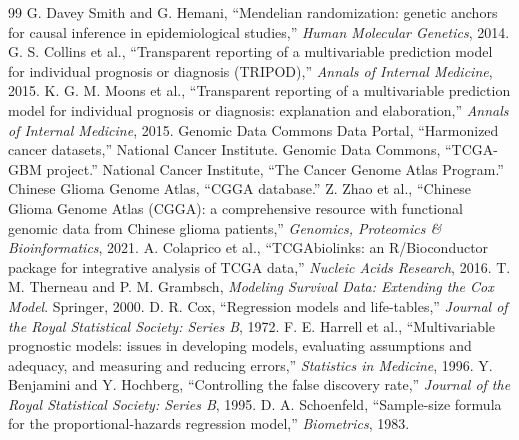 \documentclass[conference]{IEEEtran}
\begin{document}
\begin{thebibliography}{99}
 G. Davey Smith and G. Hemani, ``Mendelian randomization: genetic anchors for causal inference in epidemiological studies,'' \emph{Human Molecular Genetics}, 2014.
 G. S. Collins et al., ``Transparent reporting of a multivariable prediction model for individual prognosis or diagnosis (TRIPOD),'' \emph{Annals of Internal Medicine}, 2015.
 K. G. M. Moons et al., ``Transparent reporting of a multivariable prediction model for individual prognosis or diagnosis: explanation and elaboration,'' \emph{Annals of Internal Medicine}, 2015.
 Genomic Data Commons Data Portal, ``Harmonized cancer datasets,'' National Cancer Institute.
 Genomic Data Commons, ``TCGA-GBM project.''
 National Cancer Institute, ``The Cancer Genome Atlas Program.''
 Chinese Glioma Genome Atlas, ``CGGA database.''
 Z. Zhao et al., ``Chinese Glioma Genome Atlas (CGGA): a comprehensive resource with functional genomic data from Chinese glioma patients,'' \emph{Genomics, Proteomics \& Bioinformatics}, 2021.
 A. Colaprico et al., ``TCGAbiolinks: an R/Bioconductor package for integrative analysis of TCGA data,'' \emph{Nucleic Acids Research}, 2016.
 T. M. Therneau and P. M. Grambsch, \emph{Modeling Survival Data: Extending the Cox Model}. Springer, 2000.
 D. R. Cox, ``Regression models and life-tables,'' \emph{Journal of the Royal Statistical Society: Series B}, 1972.
 F. E. Harrell et al., ``Multivariable prognostic models: issues in developing models, evaluating assumptions and adequacy, and measuring and reducing errors,'' \emph{Statistics in Medicine}, 1996.
 Y. Benjamini and Y. Hochberg, ``Controlling the false discovery rate,'' \emph{Journal of the Royal Statistical Society: Series B}, 1995.
 D. A. Schoenfeld, ``Sample-size formula for the proportional-hazards regression model,'' \emph{Biometrics}, 1983.
\end{thebibliography}
\balance
\end{document}
